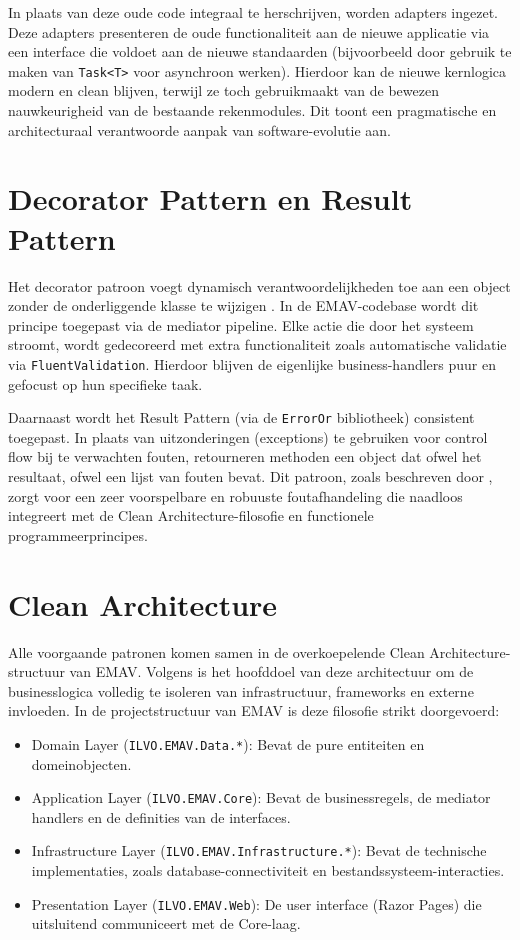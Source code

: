 In plaats van deze oude code integraal te herschrijven, worden adapters ingezet. 
Deze adapters presenteren de oude functionaliteit aan de nieuwe applicatie via een interface die voldoet aan de nieuwe standaarden (bijvoorbeeld door gebruik te maken van \texttt{Task<T>} voor asynchroon werken). 
Hierdoor kan de nieuwe kernlogica modern en clean blijven, terwijl ze toch gebruikmaakt van de bewezen nauwkeurigheid van de bestaande rekenmodules. 
Dit toont een pragmatische en architecturaal verantwoorde aanpak van software-evolutie aan.

\section{Decorator Pattern en Result Pattern}
Het decorator patroon voegt dynamisch verantwoordelijkheden toe aan een object zonder de onderliggende klasse te wijzigen \autocite{gof1994}. 
In de EMAV-codebase wordt dit principe toegepast via de mediator pipeline. 
Elke actie die door het systeem stroomt, wordt gedecoreerd met extra functionaliteit zoals automatische validatie via \texttt{FluentValidation}. 
Hierdoor blijven de eigenlijke business-handlers puur en gefocust op hun specifieke taak.

Daarnaast wordt het Result Pattern (via de \texttt{ErrorOr} bibliotheek) consistent toegepast. 
In plaats van uitzonderingen (exceptions) te gebruiken voor control flow bij te verwachten fouten, retourneren methoden een object dat ofwel het resultaat, ofwel een lijst van fouten bevat. 
Dit patroon, zoals beschreven door \textcite{khorikovResultPattern}, zorgt voor een zeer voorspelbare en robuuste foutafhandeling die naadloos integreert met de Clean Architecture-filosofie en functionele programmeerprincipes.

\section{Clean Architecture}
Alle voorgaande patronen komen samen in de overkoepelende Clean Architecture-structuur van EMAV. 
Volgens \textcite{martin2017clean} is het hoofddoel van deze architectuur om de businesslogica volledig te isoleren van infrastructuur, frameworks en externe invloeden. 
In de projectstructuur van EMAV is deze filosofie strikt doorgevoerd:
\begin{itemize}
    \item Domain Layer (\nolinkurl{ILVO.EMAV.Data.*}): Bevat de pure entiteiten en domeinobjecten.
    \item Application Layer (\texttt{ILVO.EMAV.Core}): Bevat de businessregels, de mediator handlers en de definities van de interfaces.
    \item Infrastructure Layer (\nolinkurl{ILVO.EMAV.Infrastructure.*}): Bevat de technische implementaties, zoals database-connectiviteit en bestandssysteem-interacties.
    \item Presentation Layer (\texttt{ILVO.EMAV.Web}): De user interface (Razor Pages) die uitsluitend communiceert met de Core-laag.
\end{itemize}

